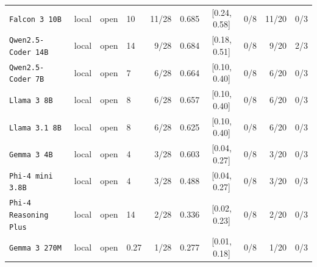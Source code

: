 \begin{table}[!htbp]
\begin{tabular}{@{}llllrrcrrr@{}}
\texttt{Falcon 3 10B} & local & open & 10 & 11/28 & 0.685 & [0.24, 0.58] & 0/8 & 11/20 & 0/3 \\
\texttt{Qwen2.5-Coder 14B} & local & open & 14 & 9/28 & 0.684 & [0.18, 0.51] & 0/8 & 9/20 & 2/3 \\
\texttt{Qwen2.5-Coder 7B} & local & open & 7 & 6/28 & 0.664 & [0.10, 0.40] & 0/8 & 6/20 & 0/3 \\
\texttt{Llama 3 8B} & local & open & 8 & 6/28 & 0.657 & [0.10, 0.40] & 0/8 & 6/20 & 0/3 \\
\texttt{Llama 3.1 8B} & local & open & 8 & 6/28 & 0.625 & [0.10, 0.40] & 0/8 & 6/20 & 0/3 \\
\texttt{Gemma 3 4B} & local & open & 4 & 3/28 & 0.603 & [0.04, 0.27] & 0/8 & 3/20 & 0/3 \\
\texttt{Phi-4 mini 3.8B} & local & open & 4 & 3/28 & 0.488 & [0.04, 0.27] & 0/8 & 3/20 & 0/3 \\
\texttt{Phi-4 Reasoning Plus} & local & open & 14 & 2/28 & 0.336 & [0.02, 0.23] & 0/8 & 2/20 & 0/3 \\
\texttt{Gemma 3 270M} & local & open & 0.27 & 1/28 & 0.277 & [0.01, 0.18] & 0/8 & 1/20 & 0/3 \\
\bottomrule
\end{tabular}
\end{table}

